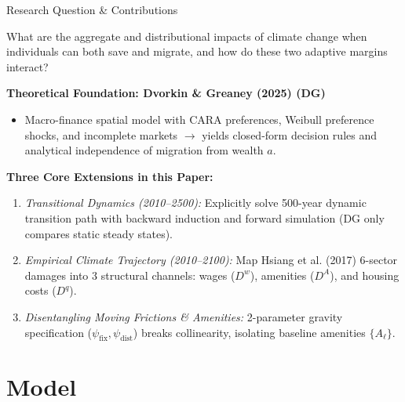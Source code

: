 \documentclass[aspectratio=169, 10pt]{beamer}
\begin{document}
\begin{frame}{Research Question \& Contributions \hfill \hyperlink{backup:siam_comparison}{\scriptsize{}}}\label{main:contributions}
    \begin{tcolorbox}[leafbox, title=Research Question]
        \small What are the aggregate and distributional impacts of climate change when individuals can both save and migrate, and how do these two adaptive margins interact?
    \end{tcolorbox}
    \vspace{0.06cm}
    {\small \textbf{Theoretical Foundation: Dvorkin \& Greaney (2025) (DG)}}
    \begin{itemize}\footnotesize
        \item Macro-finance spatial model with CARA preferences, Weibull preference shocks, and incomplete markets $\to$ yields closed-form decision rules and analytical independence of migration from wealth $a$.
    \end{itemize}
    \vspace{0.06cm}
    {\small \textbf{Three Core Extensions in this Paper:}}
    \begin{enumerate}\footnotesize\setlength{\itemsep}{2pt}
        \item \textit{Transitional Dynamics (2010--2500):} Explicitly solve 500-year dynamic transition path with backward induction and forward simulation (DG only compares static steady states).
        \item \textit{Empirical Climate Trajectory (2010--2100):} Map Hsiang et al. (2017) 6-sector damages into 3 structural channels: wages ($D^w$), amenities ($D^A$), and housing costs ($D^q$).
        \item \textit{Disentangling Moving Frictions \& Amenities:} 2-parameter gravity specification ($\psi_{\text{fix}}, \psi_{\text{dist}}$) breaks collinearity, isolating baseline amenities $\{A_\ell\}$.
    \end{enumerate}
\end{frame}

\section{Model}
\end{document}
